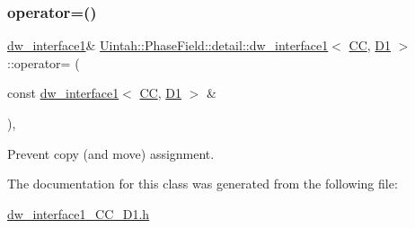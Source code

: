 \subsubsection{\texorpdfstring{operator=()}{operator=()}}
{\footnotesize\ttfamily \hyperlink{classUintah_1_1PhaseField_1_1detail_1_1dw__interface1}{dw\+\_\+interface1}\& \hyperlink{classUintah_1_1PhaseField_1_1detail_1_1dw__interface1}{Uintah\+::\+Phase\+Field\+::detail\+::dw\+\_\+interface1}$<$ \hyperlink{namespaceUintah_1_1PhaseField_a33d355affda78a83f45755ba8388cedda22303704507d024d1d6508ed9859a85a}{CC}, \hyperlink{namespaceUintah_1_1PhaseField_a12bfc68444894dffdf0cb8d9cf0cc76aa24dcc0ba6bcb45bc6f503b1b538c6809}{D1} $>$\+::operator= (\begin{DoxyParamCaption}\item[{const \hyperlink{classUintah_1_1PhaseField_1_1detail_1_1dw__interface1}{dw\+\_\+interface1}$<$ \hyperlink{namespaceUintah_1_1PhaseField_a33d355affda78a83f45755ba8388cedda22303704507d024d1d6508ed9859a85a}{CC}, \hyperlink{namespaceUintah_1_1PhaseField_a12bfc68444894dffdf0cb8d9cf0cc76aa24dcc0ba6bcb45bc6f503b1b538c6809}{D1} $>$ \&}]{ }\end{DoxyParamCaption})\hspace{0.3cm}{\ttfamily [protected]}, {\ttfamily [delete]}}



Prevent copy (and move) assignment. 



The documentation for this class was generated from the following file\+:\begin{DoxyCompactItemize}
\item 
\hyperlink{dw__interface1__CC__D1_8h}{dw\+\_\+interface1\+\_\+\+C\+C\+\_\+\+D1.\+h}\end{DoxyCompactItemize}
